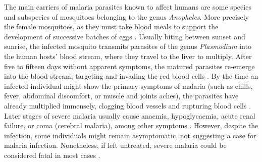 The main carriers of malaria parasites known to affect humans are some species and subspecies of mosquitoes belonging to the genus \textit{Anopheles}.
More precisely the female mosquitoes, as they must take blood meals to support the development of successive batches of eggs \cite{who2017framework}.
Usually biting between sunset and sunrise, the infected mosquito transmits parasites of the genus \textit{Plasmodium} into the human hosts' blood stream, where they travel to the liver to multiply.
After five to fifteen days without apparent symptoms, the matured parasites re-emerge into the blood stream, targeting and invading the red blood cells \cite{who2017framework}.
By the time an infected individual might show the primary symptoms of malaria (such as chills, fever, abdominal discomfort, or muscle and joints aches), the parasites have already multiplied immensely, clogging blood vessels and rupturing blood cells \cite{warrell2002essential}.
Later stages of severe malaria usually cause anaemia, hypoglycaemia, acute renal failure, or coma (cerebral malaria), among other symptoms \cite{who2015guidelines}.
However, despite the infection, some individuals might remain asymptomatic, not suggesting a case for malaria infection.
Nonetheless, if left untreated, severe malaria could be considered fatal in most cases \cite{who2015guidelines}.




